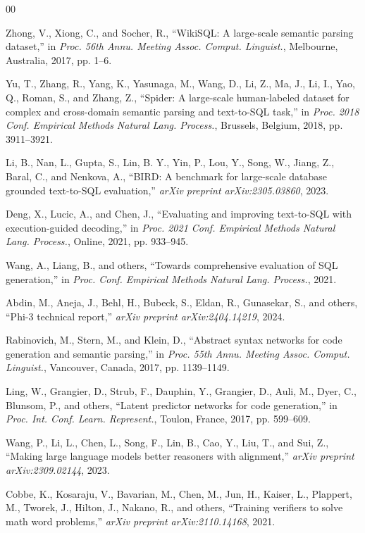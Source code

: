 \documentclass[conference]{IEEEtran}
\begin{document}
\begin{thebibliography}{00}

 Zhong, V., Xiong, C., and Socher, R., ``WikiSQL: A large-scale semantic parsing dataset,'' in \textit{Proc. 56th Annu. Meeting Assoc. Comput. Linguist.}, Melbourne, Australia, 2017, pp. 1--6.

 Yu, T., Zhang, R., Yang, K., Yasunaga, M., Wang, D., Li, Z., Ma, J., Li, I., Yao, Q., Roman, S., and Zhang, Z., ``Spider: A large-scale human-labeled dataset for complex and cross-domain semantic parsing and text-to-SQL task,'' in \textit{Proc. 2018 Conf. Empirical Methods Natural Lang. Process.}, Brussels, Belgium, 2018, pp. 3911--3921.

 Li, B., Nan, L., Gupta, S., Lin, B. Y., Yin, P., Lou, Y., Song, W., Jiang, Z., Baral, C., and Nenkova, A., ``BIRD: A benchmark for large-scale database grounded text-to-SQL evaluation,'' \textit{arXiv preprint arXiv:2305.03860}, 2023.

 Deng, X., Lucic, A., and Chen, J., ``Evaluating and improving text-to-SQL with execution-guided decoding,'' in \textit{Proc. 2021 Conf. Empirical Methods Natural Lang. Process.}, Online, 2021, pp. 933--945.

 Wang, A., Liang, B., and others, ``Towards comprehensive evaluation of SQL generation,'' in \textit{Proc. Conf. Empirical Methods Natural Lang. Process.}, 2021.

 Abdin, M., Aneja, J., Behl, H., Bubeck, S., Eldan, R., Gunasekar, S., and others, ``Phi-3 technical report,'' \textit{arXiv preprint arXiv:2404.14219}, 2024.

 Rabinovich, M., Stern, M., and Klein, D., ``Abstract syntax networks for code generation and semantic parsing,'' in \textit{Proc. 55th Annu. Meeting Assoc. Comput. Linguist.}, Vancouver, Canada, 2017, pp. 1139--1149.

 Ling, W., Grangier, D., Strub, F., Dauphin, Y., Grangier, D., Auli, M., Dyer, C., Blunsom, P., and others, ``Latent predictor networks for code generation,'' in \textit{Proc. Int. Conf. Learn. Represent.}, Toulon, France, 2017, pp. 599--609.

 Wang, P., Li, L., Chen, L., Song, F., Lin, B., Cao, Y., Liu, T., and Sui, Z., ``Making large language models better reasoners with alignment,'' \textit{arXiv preprint arXiv:2309.02144}, 2023.

 Cobbe, K., Kosaraju, V., Bavarian, M., Chen, M., Jun, H., Kaiser, L., Plappert, M., Tworek, J., Hilton, J., Nakano, R., and others, ``Training verifiers to solve math word problems,'' \textit{arXiv preprint arXiv:2110.14168}, 2021.


\end{thebibliography}
\end{document}
